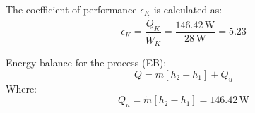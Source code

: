 The coefficient of performance \( \epsilon_K \) is calculated as:  
\[
\epsilon_K = \frac{\dot{Q}_K}{\dot{W}_K} = \frac{146.42 \, \text{W}}{28 \, \text{W}} = 5.23
\]  

Energy balance for the process (EB):  
\[
Q = \dot{m} \left[ h_2 - h_1 \right] + Q_u
\]  
Where:  
\[
Q_u = \dot{m} \left[ h_2 - h_1 \right] = 146.42 \, \text{W}
\]